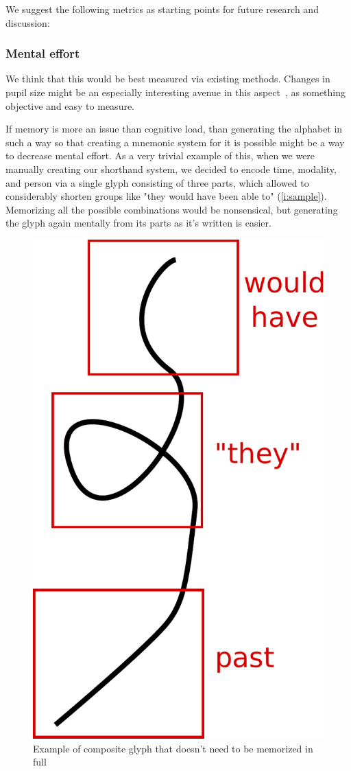 \documentclass{vgtc}                          %
\begin{document}
We suggest the following metrics as starting points for future research and discussion:

\subsubsection{Mental effort}
We think that this would be best measured via existing methods. Changes in pupil size might be an especially interesting avenue in this aspect~\cite{Alns2014PupilSS}, as something objective and easy to measure.

If memory is more an issue than cognitive load, than generating the alphabet in such a way so that creating a mnemonic system for it is possible might be a way to decrease mental effort. As a very trivial example of this, when we were manually creating our shorthand system, we decided to encode 
 time, modality, and person via a single glyph consisting of three parts, which allowed to considerably shorten groups like "they would have been able to" (\autoref{i:sample}). Memorizing all the possible combinations would be nonsensical, but generating the glyph again mentally from its parts as it's written is easier. 

\begin{figure}
\centering
        \includegraphics[width=0.35\hsize]{woudl.pdf}
        \caption{Example of composite glyph that doesn't need to be memorized in full}
        \label{i:sample}
\end{figure}
\end{document}
